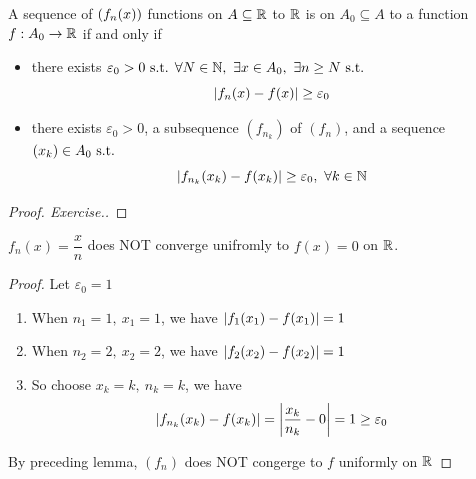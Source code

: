 \documentclass[a4paper,12pt]{article}
\begin{document}
\begin{lemma}
    A sequence of \(\seqfun[n ]{x }\) functions on \(A\subseteq\R\) to \(\R\) is  on \(A_0\subseteq A\) to a function \(f:A_0\rightarrow\R\) if and only if 
    \begin{itemize}
        \item there exists \(\varepsilon_0>0\st\forall N\in\N,\ \exists x\in A_0,\ \exists n\ge N\st\)
        \[\abs{f_n(x)-f(x)}\ge\varepsilon_0\]
        \item there exists \(\varepsilon_0>0\), a subsequence \((f_{n_k})\) of \((f_n)\), and a sequence \(\seq{x }{k }\in A_0\st\) 
        \[\abs{f_{n_k}(x_k)-f(x_k)}\ge\varepsilon_0,\ \forall k\in\N\]
    \end{itemize}
    
    \begin{proof}[Proof. Exercise.]
        
    \end{proof}
\end{lemma}

\newpage

\begin{example}
    \(f_n(x)=\dfrac{x }{n }\) does NOT converge unifromly to \(f(x)=0\) on \(\R\).
    \begin{proof}
        Let \(\varepsilon_0=1\)
        \begin{enumerate}
            \item When \(n_1=1,\ x_1=1\), we have \(\abs{f_1(x_1)-f(x_1)}= 1\)
            \item When \(n_2=2,\ x_2=2\), we have \(\abs{f_2(x_2)-f(x_2)}= 1\)
            \item So choose \(x_k=k,\ n_k=k\), we have 
            \[\abs{f_{n_k}(x_k)-f(x_k)}=\abs{\frac{x_k }{n_k}-0}=1\ge \varepsilon_0\]
        \end{enumerate}
        By preceding lemma, \((f_n)\) does NOT congerge to \(f\) uniformly on \(\R\)
    \end{proof}
\end{example}
\end{document}
